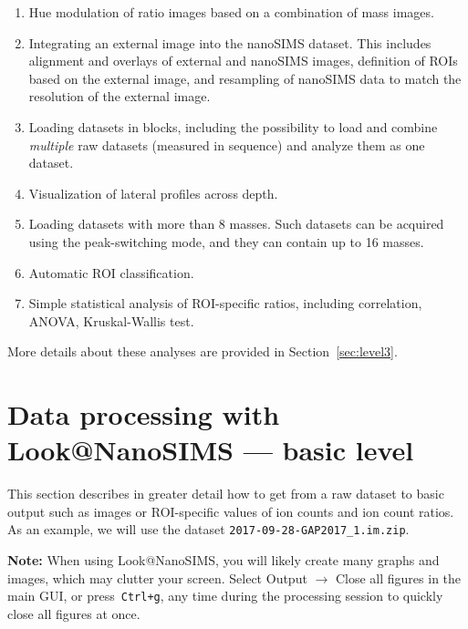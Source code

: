 \documentclass[a4paper, 11pt]{article}
\newcommand{\ttt}[1]{\texttt{#1}}
\newcommand{\lans}[1]{{\color{magenta}#1}}
\newcommand{\lanscb}[1]{{\color{darkgreen}#1}}
\newcommand{\lanstf}[1]{{\color{cyan}#1}}
\newcommand\ra{\rightarrow}
\newcommand\bb[1]{\textbf{#1}}
\begin{document}
\begin{enumerate}

\item \lanscb{Hue modulation} of ratio images based on a combination of mass images.

\item Integrating an \lans{external image} into the nanoSIMS dataset. This includes \lans{alignment} and \lans{overlays} of external and nanoSIMS images, definition of \lanstf{ROIs based on the external image}, and \lans{resampling} of nanoSIMS data to match the resolution of the external image.

\item Loading datasets in \lans{blocks}, including the possibility to load and combine \emph{multiple} raw datasets (measured in sequence) and analyze them as one dataset.

\item Visualization of \lanscb{lateral profiles across depth}.

\item Loading datasets with more than 8 masses. Such datasets can be acquired using the peak-switching mode, and they can contain up to 16 masses.

\item Automatic ROI classification.

\item Simple statistical analysis of ROI-specific ratios, including correlation, ANOVA, Kruskal-Wallis test.

\end{enumerate}
%
More details about these analyses are provided in Section~\ref{sec:level3}.


\section{Data processing with Look@NanoSIMS --- basic level}
\label{sec:level1}

This section describes in greater detail how to get from a raw dataset to basic output such as images or ROI-specific values of ion counts and ion count ratios. As an example, we will use the dataset \ttt{2017-09-28-GAP2017\_1.im.zip}.

\bb{Note:} When using Look@NanoSIMS, you will likely create many graphs and images, which may clutter your screen. Select \lans{Output} $\ra$ \lans{Close all figures} in the main GUI, or press~\ttt{Ctrl+g}, any time during the processing session to quickly close all figures at once.
\end{document}
